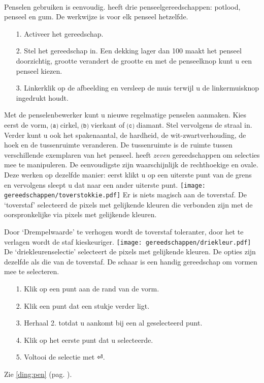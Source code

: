 \documentclass[11pt,a5paper,twoside]{book}
\begin{document}
  \paragraph{}\label{ding:gum}\label{ding:potlood} Penselen gebruiken
   is eenvoudig. \GIMP{} heeft drie penseelgereedschappen:
   potlood, penseel en gum. De werkwijze is voor elk penseel
   hetzelfde.
  \begin{itemize}
   \item[1.] Activeer het gereedschap.
   \item[2.] Stel het gereedschap in. Een dekking lager dan 100 maakt
    het penseel doorzichtig, grootte verandert de grootte en met de
    penseelknop kunt u een penseel kiezen.
   \item[3.] Linkerklik op de afbeelding en versleep de muis terwijl u
    de linkermuisknop ingedrukt houdt.
  \end{itemize}
  \label{ding:penselenbewerker}
   Met de penselenbewerker kunt u nieuwe regelmatige penselen
    aanmaken. Kies eerst de vorm, ⒜ cirkel, ⒝ vierkant of ⒞ diamant.
   Stel vervolgens de straal in. Verder kunt u ook het spakenaantal,
    de hardheid, de wit-zwartverhouding, de hoek en de tussenruimte
    veranderen. De tussenruimte is de ruimte tussen verschillende exemplaren
    van het penseel.
 \label{ding:selectie}
   \GIMP{} heeft \textit{zeven} gereedschappen om selecties mee te manipuleren.
   De eenvoudigste zijn waarschijnlijk de rechthoekige en ovale. Deze
    werken op dezelfde manier: eerst klikt u op een uiterste punt van de grens en
    vervolgens sleept u dat naar een ander uiterste punt.
   \texttt{[image: gereedschappen/toverstokkie.pdf]}
   Er is niets magisch aan de toverstaf. De ‘toverstaf’ selecteerd de pixels
    met gelijkende kleuren die verbonden zijn met de oorspronkelijke via
    pixels met gelijkende kleuren.

   Door ‘Drempelwaarde’ te verhogen wordt de toverstaf toleranter,
    door het te verlagen wordt de staf kieskeuriger.
   \texttt{[image: gereedschappen/driekleur.pdf]}
   De ‘driekleurenselectie’ selecteert de pixels met gelijkende kleuren.
   De opties zijn dezelfde als die van de toverstaf.
   De schaar is een handig gereedschap om vormen mee te selecteren.
   \begin{itemize}
    \item[1.] Klik op een punt aan de rand van de vorm.
    \item[2.] Klik een punt dat een stukje verder ligt.
    \item[3.] Herhaal 2. totdat u aankomt bij een al geselecteerd punt.
    \item[4.] Klik op het eerste punt dat u selecteerde.
    \item[5.] Voltooi de selectie met ⏎.
   \end{itemize}
   Zie \ref{ding:pen} (pag. \pageref{ding:pen}).
\end{document}
